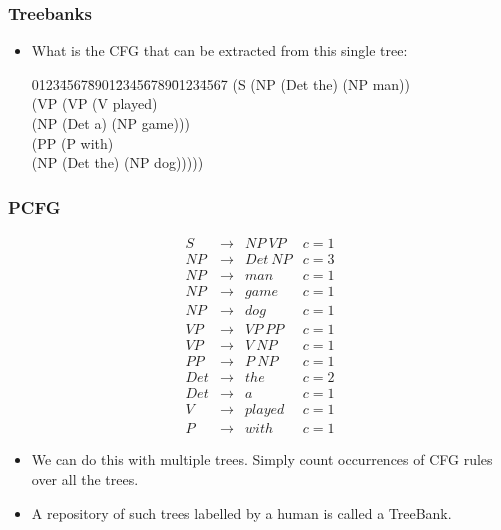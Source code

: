 \begin{frame}
\frametitle{Treebanks}
\begin{itemize}
\item What is the CFG that can be extracted from this single tree: 
\begin{tabbing}
0123\=4567\=8901\=2345\=6789\=0123\=4567 \kill
(S \>(NP (Det the) (NP man)) \\
\> (VP \> (VP \> (V played) \\
\> \> \> (NP (Det a) (NP game))) \\
\> \> (PP \>(P with) \\
\> \> \> (NP (Det the) (NP dog)))))
\end{tabbing}
\end{itemize}
\end{frame}

\begin{frame}
\frametitle{PCFG}
{\small
\[
\begin{array}{cccc}
 S & \rightarrow & NP~VP  & c=1  \\
 NP & \rightarrow & Det~NP & c=3  \\
 NP & \rightarrow & man  & c=1   \\
 NP & \rightarrow & game  & c=1   \\
 NP & \rightarrow & dog  & c=1   \\
 VP & \rightarrow & VP~PP  & c=1  \\
 VP & \rightarrow & V~NP  & c=1  \\
 PP & \rightarrow & P~NP  & c=1  \\
 Det & \rightarrow & the  & c=2  \\
 Det & \rightarrow & a  & c=1   \\
 V & \rightarrow & played & c=1  \\
 P & \rightarrow & with & c=1 
\end{array}
\] 
}
\begin{itemize}
\item We can do this with multiple trees. Simply count occurrences of CFG rules over all the trees. 
\item A repository of such trees labelled by a human is called a TreeBank.
\end{itemize}
\end{frame}

